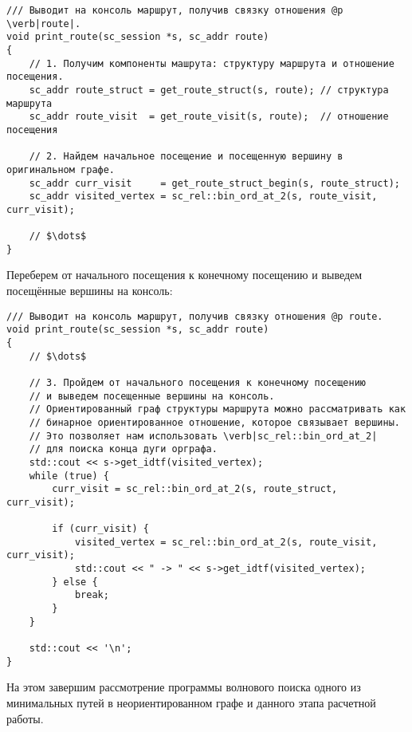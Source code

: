 \begin{lstlisting}[texcl]
/// Выводит на консоль маршрут, получив связку отношения @p \verb|route|.
void print_route(sc_session *s, sc_addr route)
{
    // 1. Получим компоненты машрута: структуру маршрута и отношение посещения.
    sc_addr route_struct = get_route_struct(s, route); // структура маршрута
    sc_addr route_visit  = get_route_visit(s, route);  // отношение посещения

    // 2. Найдем начальное посещение и посещенную вершину в оригинальном графе.
    sc_addr curr_visit     = get_route_struct_begin(s, route_struct);
    sc_addr visited_vertex = sc_rel::bin_ord_at_2(s, route_visit, curr_visit);

    // $\dots$
}
\end{lstlisting}

Переберем от начального посещения к конечному посещению и выведем
посещённые вершины на консоль:

\begin{lstlisting}[texcl]
/// Выводит на консоль маршрут, получив связку отношения @p route.
void print_route(sc_session *s, sc_addr route)
{
    // $\dots$

    // 3. Пройдем от начального посещения к конечному посещению
    // и выведем посещенные вершины на консоль.
    // Ориентированный граф структуры маршрута можно рассматривать как
    // бинарное ориентированное отношение, которое связывает вершины.
    // Это позволяет нам использовать \verb|sc_rel::bin_ord_at_2|
    // для поиска конца дуги орграфа.
    std::cout << s->get_idtf(visited_vertex);
    while (true) {
        curr_visit = sc_rel::bin_ord_at_2(s, route_struct, curr_visit);

        if (curr_visit) {
            visited_vertex = sc_rel::bin_ord_at_2(s, route_visit, curr_visit);
            std::cout << " -> " << s->get_idtf(visited_vertex);
        } else {
            break;
        }
    }

    std::cout << '\n';
}
\end{lstlisting}

На этом завершим рассмотрение программы волнового поиска одного из
минимальных путей в неориентированном графе и данного этапа расчетной
работы.

